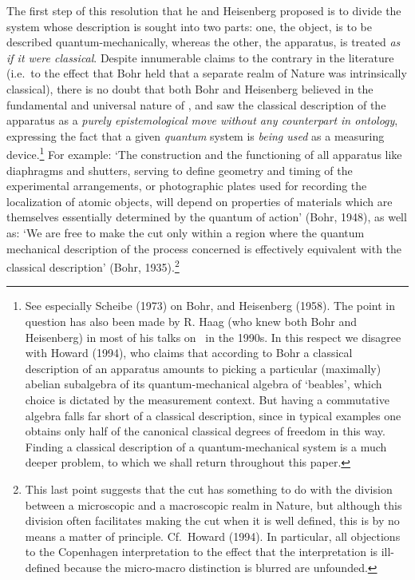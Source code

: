 \documentclass[12pt]{article}
\begin{document}
 The first step of this  resolution that he and Heisenberg proposed is to divide the system whose description is sought into two parts: one, the object, is to be described quantum-mechanically, whereas the other, the apparatus, is treated \textit{as if it were classical}. 
Despite innumerable claims to the contrary in the literature  (i.e.\ to the effect that Bohr held that a separate realm of Nature was intrinsically classical), there is no doubt that
both Bohr and Heisenberg believed in the fundamental and universal nature of \qm, and 
saw the classical description of the apparatus as a {\it purely epistemological move without any counterpart in ontology},
expressing the fact that a given {\it quantum} system is {\it being used} as a measuring device.\footnote{See especially Scheibe (1973) on Bohr, and Heisenberg (1958). The point in question has also been made by R. Haag (who knew both Bohr and Heisenberg) in most of his talks on \qm\ in the 1990s.
In this respect we disagree with Howard (1994), who claims that according to Bohr a classical description of an apparatus amounts to picking a particular (maximally) abelian subalgebra of its quantum-mechanical algebra of `beables', which choice is dictated by the measurement context. But having a commutative algebra falls far short of a classical description, since in typical examples one obtains only half of the canonical classical degrees of freedom in this way. Finding a classical description of a 
 quantum-mechanical system is a much deeper problem, to which we shall return throughout this paper.} For example: `The construction and the functioning of all apparatus like diaphragms and shutters, serving to define geometry and timing of the experimental arrangements, or photographic plates used for recording the localization of atomic objects, will depend on properties of materials which are themselves essentially determined by the quantum of action' (Bohr, 1948), as well as: 
`We are free to make the cut only within a region where the quantum mechanical description of the process concerned is effectively equivalent with the classical description'
(Bohr, 1935).\footnote{This last point suggests that the cut has something to do with the division between a microscopic and a macroscopic realm in Nature, 
but although this division often facilitates making the cut when it is well defined, this is by no means a matter of principle. Cf.\ Howard (1994).
In particular, all objections to the Copenhagen interpretation to the effect
that the interpretation is ill-defined because the micro-macro distinction is blurred are unfounded. }
\end{document}
